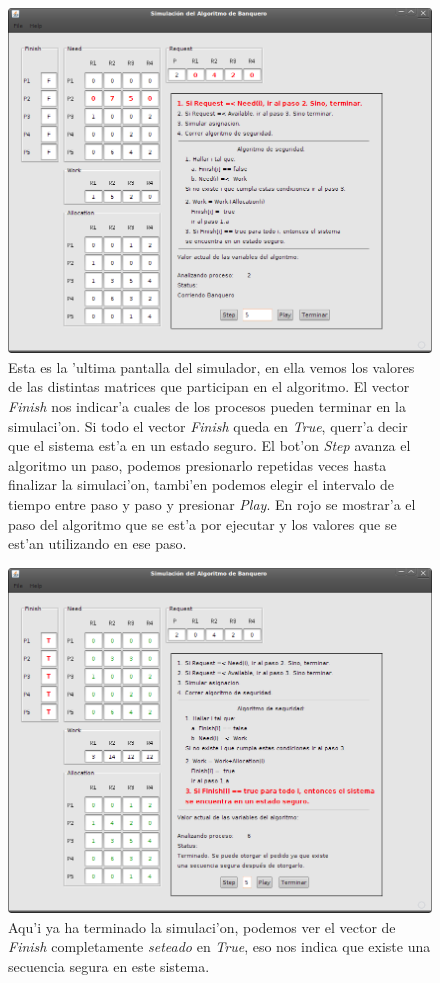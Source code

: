\begin{figure}[h!]
\centering
 \includegraphics[scale=0.3,keepaspectratio=true]{./imagenes/banquero/banquero3.png}
 \caption{Esta es la 'ultima pantalla del simulador, en ella vemos los valores de las distintas matrices que participan en el algoritmo. El vector \emph{Finish} nos indicar'a cuales de los procesos pueden terminar en la simulaci'on. Si todo el vector \emph{Finish} queda en \emph{True}, querr'a decir que el sistema est'a en un estado seguro. El bot'on \emph{Step} avanza el algoritmo un paso, podemos presionarlo repetidas veces hasta finalizar la simulaci'on, tambi'en podemos elegir el intervalo de tiempo entre paso y paso y presionar \emph{Play}. En rojo se mostrar'a el paso del algoritmo que se est'a por ejecutar y los valores que se est'an utilizando en ese paso.} 
\end{figure}

\begin{figure}[h!]
\centering
 \includegraphics[scale=0.3,keepaspectratio=true]{./imagenes/banquero/banquero4.png}
 \caption{Aqu'i ya ha terminado la simulaci'on, podemos ver el vector de \emph{Finish} completamente \emph{seteado} en \emph{True}, eso nos indica que existe una secuencia segura en este sistema.} 
\end{figure}

\newpage

